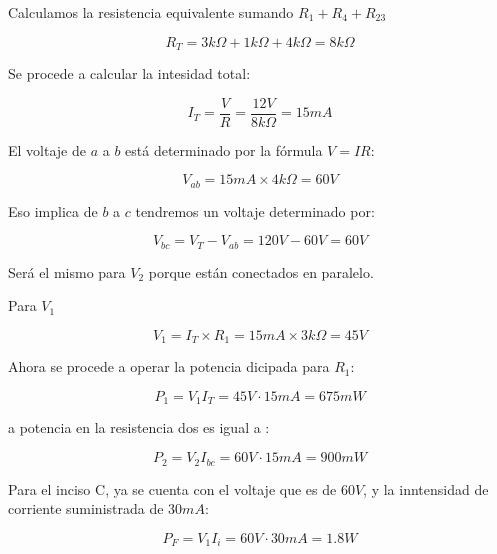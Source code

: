 \begin{enumerate}
	      Calculamos la resistencia equivalente sumando $R_1+R_4+R_{23}$

	      \begin{equation*}
		      R_T=3k\Omega+1k\Omega+4k\Omega=8k\Omega
	      \end{equation*}

	      Se procede a calcular la intesidad total:

	      \begin{equation*}
		      I_T=\frac{V}{R}=\frac{12V}{8k\Omega}=15mA
	      \end{equation*}

	      El voltaje de $a$ a $b$ está determinado por la fórmula $V=IR$:

	      \begin{equation*}
		      V_{ab}=15mA\times 4k\Omega=60V
	      \end{equation*}

	      Eso implica de $b$ a $c$ tendremos un voltaje determinado por:

	      \begin{equation*}
		      V_{bc}=V_T-V_{ab}=120V-60V=60V
	      \end{equation*}

	      Será el mismo para $V_2$ porque están conectados en paralelo.

	      Para $V_1$

	      \begin{equation*}
		      V_1=I_T\times R_1=15mA\times 3k\Omega=45V
	      \end{equation*}

	      Ahora se procede a operar la potencia dicipada para $R_1$:

	      \begin{equation*}
		      P_1=V_1I_T=45V\cdot 15mA=675mW
	      \end{equation*}

	      a potencia en la resistencia dos es igual a :

	      \begin{equation*}
		      P_2=V_2I_{bc}=60V\cdot 15mA=900mW
	      \end{equation*}

	      Para el inciso C, ya se cuenta con el voltaje que es de $60V$, y la inntensidad de corriente suministrada de $30mA$:

	      \begin{equation*}
		      P_F= V_1I_i=60V\cdot 30mA=1.8 W
	      \end{equation*}


\end{enumerate}
